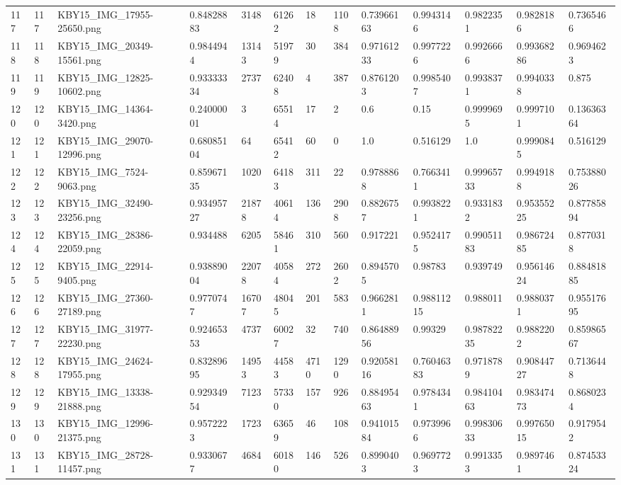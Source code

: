 \documentclass[11pt, a4paper, twoside]{report}
\begin{document}
\begin{longtable}[c]{@{}lllllllllllll@{}}
117 & 117 & KBY15\_IMG\_17955-25650.png & 0.84828883 & 3148 & 61262 & 18 & 1108 & 0.73966163 & 0.9943146 & 0.9822351 & 0.9828186 & 0.7365466 \\
118 & 118 & KBY15\_IMG\_20349-15561.png & 0.9844944 & 13143 & 51979 & 30 & 384 & 0.97161233 & 0.9977226 & 0.9926666 & 0.99368286 & 0.9694623 \\
119 & 119 & KBY15\_IMG\_12825-10602.png & 0.93333334 & 2737 & 62408 & 4 & 387 & 0.8761203 & 0.9985407 & 0.9938371 & 0.9940338 & 0.875 \\
120 & 120 & KBY15\_IMG\_14364-3420.png & 0.24000001 & 3 & 65514 & 17 & 2 & 0.6 & 0.15 & 0.9999695 & 0.9997101 & 0.13636364 \\
121 & 121 & KBY15\_IMG\_29070-12996.png & 0.68085104 & 64 & 65412 & 60 & 0 & 1.0 & 0.516129 & 1.0 & 0.9990845 & 0.516129 \\
122 & 122 & KBY15\_IMG\_7524-9063.png & 0.85967135 & 1020 & 64183 & 311 & 22 & 0.9788868 & 0.7663411 & 0.99965733 & 0.9949188 & 0.75388026 \\
123 & 123 & KBY15\_IMG\_32490-23256.png & 0.93495727 & 21878 & 40614 & 136 & 2908 & 0.8826757 & 0.9938221 & 0.9331832 & 0.95355225 & 0.87785894 \\
124 & 124 & KBY15\_IMG\_28386-22059.png & 0.934488 & 6205 & 58461 & 310 & 560 & 0.917221 & 0.9524175 & 0.99051183 & 0.98672485 & 0.8770318 \\
125 & 125 & KBY15\_IMG\_22914-9405.png & 0.93889004 & 22078 & 40584 & 272 & 2602 & 0.8945705 & 0.98783 & 0.939749 & 0.95614624 & 0.88481885 \\
126 & 126 & KBY15\_IMG\_27360-27189.png & 0.9770747 & 16707 & 48045 & 201 & 583 & 0.9662811 & 0.98811215 & 0.988011 & 0.9880371 & 0.95517695 \\
127 & 127 & KBY15\_IMG\_31977-22230.png & 0.92465353 & 4737 & 60027 & 32 & 740 & 0.86488956 & 0.99329 & 0.98782235 & 0.9882202 & 0.85986567 \\
128 & 128 & KBY15\_IMG\_24624-17955.png & 0.83289695 & 14953 & 44583 & 4710 & 1290 & 0.92058116 & 0.76046383 & 0.9718789 & 0.90844727 & 0.7136448 \\
129 & 129 & KBY15\_IMG\_13338-21888.png & 0.92934954 & 7123 & 57330 & 157 & 926 & 0.88495463 & 0.9784341 & 0.98410463 & 0.98347473 & 0.8680234 \\
130 & 130 & KBY15\_IMG\_12996-21375.png & 0.9572223 & 1723 & 63659 & 46 & 108 & 0.94101584 & 0.9739966 & 0.99830633 & 0.99765015 & 0.9179542 \\
131 & 131 & KBY15\_IMG\_28728-11457.png & 0.9330677 & 4684 & 60180 & 146 & 526 & 0.8990403 & 0.9697723 & 0.9913353 & 0.9897461 & 0.87453324 \\

\end{longtable}
\end{document}
